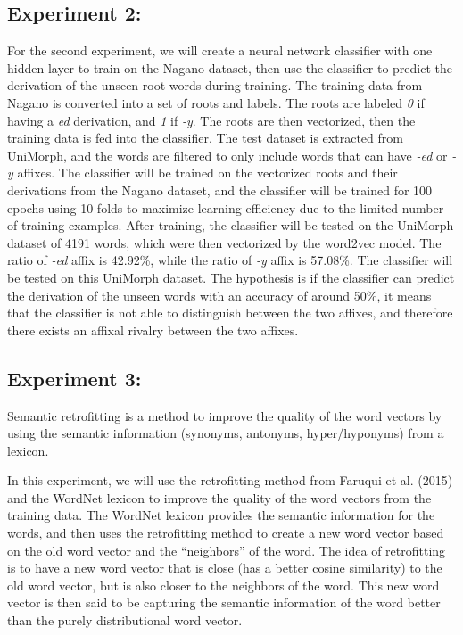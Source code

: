 \documentclass[12pt]{article}
\begin{document}
\subsection{Experiment 2:}
    For the second experiment, we will create a neural network classifier with one hidden layer to train on the Nagano dataset, then use the classifier to predict the derivation of the unseen root words during training. The training data from Nagano is converted into a set of roots and labels. The roots are labeled \emph{0} if having a \emph{ed} derivation, and \emph{1} if \emph{-y}. The roots are then vectorized, then the training data is fed into the classifier. The test dataset is extracted from UniMorph, and the words are filtered to only include words that can have \emph{-ed} or \emph{-y} affixes. The classifier will be trained on the vectorized roots and their derivations from the Nagano dataset, and the classifier will be trained for 100 epochs using 10 folds to maximize learning efficiency due to the limited number of training examples. After training, the classifier will be tested on the UniMorph dataset of 4191 words, which were then vectorized by the word2vec model. The ratio of \emph{-ed} affix is 42.92\%, while the ratio of \emph{-y} affix is 57.08\%. The classifier will be tested on this UniMorph dataset. The hypothesis is if the classifier can predict the derivation of the unseen words with an accuracy of around 50\%, it means that the classifier is not able to distinguish between the two affixes, and therefore there exists an affixal rivalry between the two affixes.

\subsection{Experiment 3:}
    Semantic retrofitting is a method to improve the quality of the word vectors by using the semantic information (synonyms, antonyms, hyper/hyponyms) from a lexicon. 

    In this experiment, we will use the retrofitting method from Faruqui et al. (2015) and the WordNet lexicon to improve the quality of the word vectors from the training data. The WordNet lexicon provides the semantic information for the words, and then uses the retrofitting method to create a new word vector based on the old word vector and the ``neighbors'' of the word. The idea of retrofitting is to have a new word vector that is close (has a better cosine similarity) to the old word vector, but is also closer to the neighbors of the word. This new word vector is then said to be capturing the semantic information of the word better than the purely distributional word vector.
\end{document}
